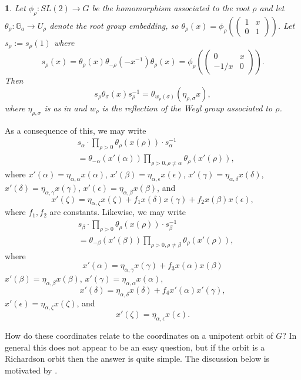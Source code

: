 \documentclass[12pt,letterpaper]{amsart}
\newcommand{\gga}{\mathbb{G}}
\newcommand{\proclaimname}{}
\newtheorem*{proclaimx}{\proclaimname}
\newenvironment{proclaim}[1]%
  {\renewcommand{\proclaimname}{#1}\begin{proclaimx}}{\end{proclaimx}}
\begin{document}
\begin{proclaim}{Lemma 2.15}
Let $\phi_\rho:SL(2)\rightarrow G$ be the
homomorphism associated to the root
$\rho$ and let $\theta_\rho:\gga_a\rightarrow U_\rho$ denote the root
group embedding, so
$\theta_\rho(x)=\phi_\rho(\begin{pmatrix} 1&x\\ 0&1\end{pmatrix})$. Let
$s_\rho:=s_\rho(1)$ where
\[
s_\rho(x)=\theta_\rho(x)\theta_{-\rho}(-x^{-1})\theta_\rho(x)
=\phi_\rho(\begin{pmatrix} 0&x\\ -1/x&0\end{pmatrix}).
\]
Then
\[
s_\rho \theta_\sigma (x)s_\rho^{-1}
=\theta_{w_\rho(\sigma)}(\eta_{\rho,\sigma}x),
\]
where $\eta_{\rho,\sigma}$ is as in \cite[pp 94-96]{Ca89} and $w_\rho$ is
the reflection of the Weyl group associated to $\rho$.
\end{proclaim}

As a consequence of this, we may write
\[
\begin{split}
&s_\alpha\cdot \prod_{\rho>0}\theta_{\rho}(x(\rho))\cdot s_\alpha^{-1}\\
&=\theta_{-\alpha}(x'(\alpha))
\prod_{\rho>0, \rho\not=\alpha}\theta_{\rho}(x'(\rho)),
\end{split}
\tag{2.16}
\]
where $x'(\alpha)=\eta_{\alpha,\alpha}x(\alpha)$,
$x'(\beta)=\eta_{\alpha,\epsilon}x(\epsilon)$,
$x'(\gamma)=\eta_{\alpha,\delta}x(\delta)$,
$x'(\delta)=\eta_{\alpha,\gamma}x(\gamma)$,
$x'(\epsilon)=\eta_{\alpha,\beta}x(\beta)$,
and
\[
x'(\zeta)=\eta_{\alpha,\zeta}x(\zeta)+
f_1x(\delta)x(\gamma)+f_2x(\beta)x(\epsilon),
\]
where $f_1,f_2$ are constants. Likewise, we may write
\[
\begin{split}
&s_\beta\cdot \prod_{\rho>0}\theta_{\rho}(x(\rho))\cdot s_\beta^{-1}\\
&=\theta_{-\beta}(x'(\beta))
\prod_{\rho>0, \rho\not=\beta}\theta_{\rho}(x'(\rho)),
\end{split}
\tag{2.17}
\]
where
\[
x'(\alpha)=\eta_{\alpha,\gamma}x(\gamma)+f_3x(\alpha)x(\beta)
\]
$x'(\beta)=\eta_{\alpha,\beta}x(\beta)$,
$x'(\gamma)=\eta_{\alpha,\alpha}x(\alpha)$,
\[
x'(\delta)=\eta_{\alpha,\delta}x(\delta)+f_4x'(\alpha)x'(\gamma),
\]
$x'(\epsilon)=\eta_{\alpha,\zeta}x(\zeta)$,
and
\[
x'(\zeta)=\eta_{\alpha,\epsilon}x(\epsilon).
\]

\iffalse
How do these coordinates relate to the coordinates on a unipotent orbit
of $G$? In general this does not appear to be an easy question, but if the
orbit is a Richardson orbit then the answer is quite simple. The discussion
below is motivated by \cite[Remark V.2.2]{Ha92a}.
\end{document}
